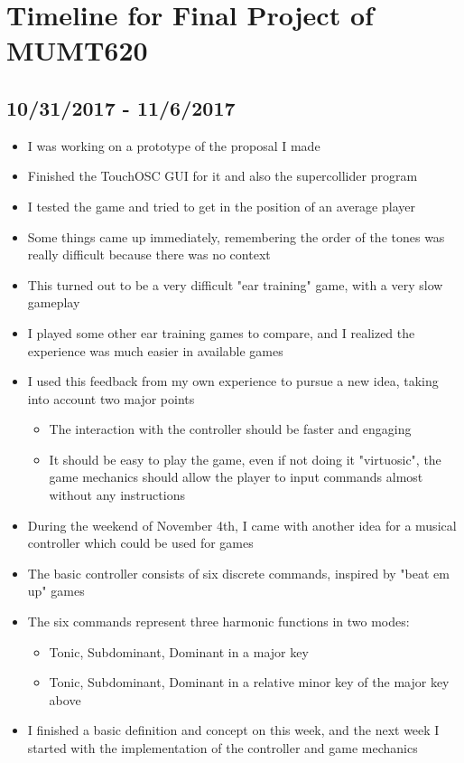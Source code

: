 
\section{Timeline for Final Project of MUMT620}
	\subsection{10/31/2017 - 11/6/2017}
		\begin{itemize}
			\item I was working on a prototype of the proposal I made
			\item Finished the TouchOSC GUI for it and also the supercollider program
			\item I tested the game and tried to get in the position of an average player
			\item Some things came up immediately, remembering the order of the tones was really difficult because there was no context
			\item This turned out to be a very difficult "ear training" game, with a very slow gameplay
			\item I played some other ear training games to compare, and I realized the experience was much easier in available games
			\item I used this feedback from my own experience to pursue a new idea, taking into account two major points
			\begin{itemize}
				\item The interaction with the controller should be faster and engaging
				\item It should be easy to play the game, even if not doing it "virtuosic", the game mechanics should allow the player to input commands almost without any instructions
			\end{itemize}
			\item During the weekend of November 4th, I came with another idea for a musical controller which could be used for games
			\item The basic controller consists of six discrete commands, inspired by "beat em up" games
			\item The six commands represent three harmonic functions in two modes:
				\begin{itemize}
					\item Tonic, Subdominant, Dominant in a major key
					\item Tonic, Subdominant, Dominant in a relative minor key of the major key above
				\end{itemize}
			\item I finished a basic definition and concept on this week, and the next week I started with the implementation of the controller and game mechanics
		\end{itemize}  

